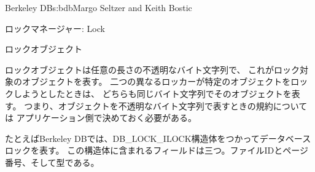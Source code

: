 \begin{aosachapter}{Berkeley DB}{s:bdb}{Margo Seltzer and Keith Bostic}
\begin{aosasect1}{ロックマネージャー: Lock}
\begin{aosasect2}{ロックオブジェクト}

ロックオブジェクトは任意の長さの不透明なバイト文字列で、
これがロック対象のオブジェクトを表す。
二つの異なるロッカーが特定のオブジェクトをロックしようとしたときは、
どちらも同じバイト文字列でそのオブジェクトを表す。
つまり、オブジェクトを不透明なバイト文字列で表すときの規約については
アプリケーション側で決めておく必要がある。

たとえばBerkeley DBでは、DB\_LOCK\_ILOCK構造体をつかってデータベースロックを表す。
この構造体に含まれるフィールドは三つ。ファイルIDとページ番号、そして型である。


\end{aosasect2}
\end{aosasect1}
\end{aosachapter}
